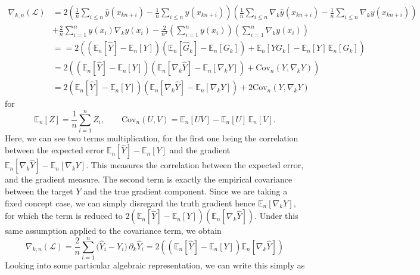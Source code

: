 \documentclass[10pt]{article} %
\begin{document}
\begin{align}
\nabla_{k,n}(\mathcal{L})
&= 2\left(\frac{1}{n}\sum_{i\le n}\hat{y}(x_{kn+i}) - \frac{1}{n}\sum_{i\le n}y(x_{kn+i})\right)
   \left(\frac{1}{n}\sum_{i\le n}\nabla_k\hat{y}(x_{kn+i}) - \frac{1}{n}\sum_{i\le n}\nabla_k y(x_{kn+i})\right) \\
&+ \frac{2}{n}\sum_{i=1}^n y(x_i)\nabla_k y(x_i)
   - \frac{2}{n^2}\left(\sum_{i=1}^n y(x_i)\right)\left(\sum_{i=1}^n \nabla_k y(x_i)\right)\\
   & = = 2 \left(
   \left( \mathbb{E}_n[\hat{Y}] - \mathbb{E}_n[Y] \right)
   \left( \mathbb{E}_n[\hat{G}_k] - \mathbb{E}_n[G_k] \right)
   + \mathbb{E}_n[Y G_k] - \mathbb{E}_n[Y] \,\mathbb{E}_n[G_k]
\right)\\
&= 2 \left( 
   \left( \mathbb{E}_n[\hat{Y}] - \mathbb{E}_n[Y] \right)
   \left( \mathbb{E}_n[\nabla_k \hat{Y}] - \mathbb{E}_n[\nabla_k Y] \right)
   + \mathrm{Cov}_n\!\left(Y, \nabla_k Y\right)
\right) \\
& = 2 
   \left( \mathbb{E}_n[\hat{Y}] - \mathbb{E}_n[Y] \right)
   \left( \mathbb{E}_n[\nabla_k \hat{Y}] - \mathbb{E}_n[\nabla_k Y] \right) + 2\mathrm{Cov}_n\!\left(Y, \nabla_k Y\right)
\end{align}
for 
\begin{equation}
    \mathbb{E}_n[Z] = \frac{1}{n} \sum_{i=1}^n Z_i,
\qquad
\mathrm{Cov}_n(U,V) = \mathbb{E}_n[UV] - \mathbb{E}_n[U] \,\mathbb{E}_n[V].
\end{equation}
Here, we can see two terms multiplication, for the first one being the correlation between the expected error $\mathbb{E}_n[\hat{Y}] - \mathbb{E}_n[Y]$ and the gradient $\mathbb{E}_n[\nabla_k \hat{Y}] - \mathbb{E}_n[\nabla_k Y]$. This measures the correlation between the expected error, and the gradient measure. The second term is exactly the empirical covariance between the target $Y$ and the true gradient component. Since we are taking a fixed concept case, we can simply disregard the truth gradient hence $\mathbb{E}_n[\nabla_k Y]$, for which the term is reduced to $2\left( \mathbb{E}_n[\hat{Y}] - \mathbb{E}_n[Y] \right) \left( \mathbb{E}_n[\nabla_k \hat{Y}] \right)$. Under this same assumption applied to the covariance term, we obtain
\begin{equation}
    \nabla_{k,n}(\mathcal{L})
= \frac{2}{n}\sum_{i=1}^n \big(\hat Y_i - Y_i\big)\,\partial_k \hat Y_i = 2\left(
   \left( \mathbb{E}_n[\hat{Y}] - \mathbb{E}_n[Y] \right)
   \mathbb{E}_n[\nabla_k \hat{Y}]
\right)
\end{equation}
Looking into some particular algebraic representation, we can write this simply as
\end{document}
